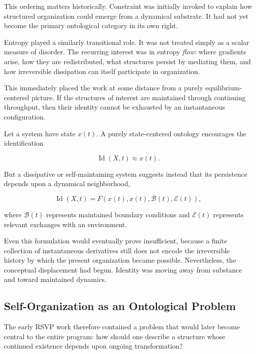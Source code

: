 \documentclass[11pt]{article}
\theoremstyle{remark}
\newcommand{\RSVP}{\textsc{RSVP}}
\begin{document}
This ordering matters historically. Constraint was initially invoked to explain how structured organization could emerge from a dynamical substrate. It had not yet become the primary ontological category in its own right.

Entropy played a similarly transitional role. It was not treated simply as a scalar measure of disorder. The recurring interest was in entropy \emph{flow}: where gradients arise, how they are redistributed, what structures persist by mediating them, and how irreversible dissipation can itself participate in organization.

This immediately placed the work at some distance from a purely equilibrium-centered picture. If the structures of interest are maintained through continuing throughput, then their identity cannot be exhausted by an instantaneous configuration.

Let a system have state $x(t)$. A purely state-centered ontology encourages the identification

\begin{equation}
\operatorname{Id}(X,t)
\approx
x(t).
\end{equation}

But a dissipative or self-maintaining system suggests instead that its persistence depends upon a dynamical neighborhood,

\begin{equation}
\operatorname{Id}(X,t)
=
F\!\left(
x(t),
\dot{x}(t),
\mathcal{B}(t),
\mathcal{E}(t)
\right),
\end{equation}

where $\mathcal{B}(t)$ represents maintained boundary conditions and $\mathcal{E}(t)$ represents relevant exchanges with an environment.

Even this formulation would eventually prove insufficient, because a finite collection of instantaneous derivatives still does not encode the irreversible history by which the present organization became possible. Nevertheless, the conceptual displacement had begun. Identity was moving away from substance and toward maintained dynamics.

\subsection{Self-Organization as an Ontological Problem}

The early \RSVP{} work therefore contained a problem that would later become central to the entire program: how should one describe a structure whose continued existence depends upon ongoing transformation?
\end{document}
